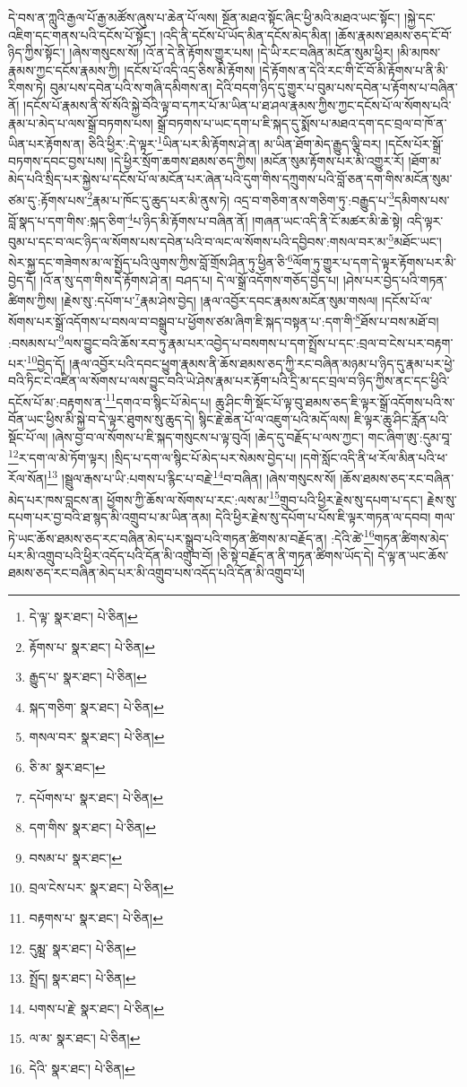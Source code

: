 དེ་བས་ན་ཀླུའི་རྒྱལ་པོ་རྒྱ་མཚོས་ཞུས་པ་ཆེན་པོ་ལས། སྔོན་མཐའ་སྟོང་ཞིང་ཕྱི་མའི་མཐའ་ཡང་སྟོང་། །སྐྱེ་དང་འཇིག་དང་གནས་པའི་དངོས་པོ་སྟོང་། །འདི་ནི་དངོས་པོ་ཡོད་མིན་དངོས་མེད་མིན། །ཆོས་རྣམས་ཐམས་ཅད་ངོ་བོ་ཉིད་ཀྱིས་སྟོང་། །ཞེས་གསུངས་སོ། །འོ་ན་དེ་ནི་རྟོགས་གྱུར་པས། །དེ་ཡི་རང་བཞིན་མངོན་སུམ་ཕྱིར། །མི་མཁས་རྣམས་ཀྱང་དངོས་རྣམས་ཀྱི། །དངོས་པོ་འདི་འདྲ་ཅིས་མི་རྟོགས། །དེ་རྟོགས་ན་དེའི་རང་གི་ངོ་བོ་མི་རྟོགས་པ་ནི་མི་རིགས་ཏེ། བུམ་པས་དབེན་པའི་ས་གཞི་དམིགས་ན། དེའི་བདག་ཉིད་དུ་གྱུར་པ་བུམ་པས་དབེན་པ་རྟོགས་པ་བཞིན་ནོ། །དངོས་པོ་རྣམས་ནི་སོ་སོའི་སྐྱེ་བོའི་ལྟ་བ་དཀར་པོ་མ་ཡིན་པ་ཐ་ཤལ་རྣམས་ཀྱིས་ཀྱང་དངོས་པོ་ལ་སོགས་པའི་རྣམ་པ་མེད་པ་ལས་སྒྲོ་བཏགས་པས། སྒྲོ་བཏགས་པ་ཡང་དག་པ་ཇི་སྐད་དུ་སྨོས་པ་མཐའ་དག་དང་བྲལ་བ་ཁོ་ན་ཡིན་པར་རྟོགས་ན། ཅིའི་ཕྱིར་:དེ་ལྟར་\footnote{དེ་ལྟ་  སྣར་ཐང་།  པེ་ཅིན། }ཡིན་པར་མི་རྟོགས་ཤེ་ན། མ་ཡིན་ཐོག་མེད་རྒྱུད་ལྕི་བར། །དངོས་པོར་སྒྲོ་བཏགས་དབང་བྱས་པས། །དེ་ཕྱིར་སྲོག་ཆགས་ཐམས་ཅད་ཀྱིས། །མངོན་སུམ་རྟོགས་པར་མི་འགྱུར་རོ། །ཐོག་མ་མེད་པའི་སྲིད་པར་སྐྱེས་པ་དངོས་པོ་ལ་མངོན་པར་ཞེན་པའི་དུག་གིས་དཀྲུགས་པའི་བློ་ཅན་དག་གིས་མངོན་སུམ་ཙམ་དུ་:རྟོགས་པས་\footnote{རྟོགས་པ་  སྣར་ཐང་།  པེ་ཅིན། }རྣམ་པ་ཁོང་དུ་ཆུད་པར་མི་ནུས་ཏེ། འདྲ་བ་གཅིག་ནས་གཅིག་ཏུ་:བརྒྱུད་པ་\footnote{རྒྱུད་པ་  སྣར་ཐང་།  པེ་ཅིན། }དམིགས་པས་བློ་སྣད་པ་དག་གིས་:སྐད་ཅིག་\footnote{སྐད་གཅིག་  སྣར་ཐང་།  པེ་ཅིན། }པ་ཉིད་མི་རྟོགས་པ་བཞིན་ནོ། །གཞན་ཡང་འདི་ནི་ངོ་མཚར་མི་ཆེ་སྟེ། འདི་ལྟར་བུམ་པ་དང་བ་ལང་ཉིད་ལ་སོགས་པས་དབེན་པའི་བ་ལང་ལ་སོགས་པའི་དབྱིབས་:གསལ་བར་མ་\footnote{གསལ་བར་  སྣར་ཐང་།  པེ་ཅིན། }མཐོང་ཡང་། སེར་སྐྱ་དང་གཟེགས་མ་ལ་སྤྱོད་པའི་ལུགས་ཀྱིས་བློ་གྲོས་ཤིན་ཏུ་ཕྱིན་ཅི་\footnote{ཅི་མ་  སྣར་ཐང་། }ལོག་ཏུ་གྱུར་པ་དག་དེ་ལྟར་རྟོགས་པར་མི་བྱེད་དོ། །འོ་ན་སུ་དག་གིས་དེ་རྟོགས་ཤེ་ན། བཤད་པ། དེ་ལ་སྒྲོ་འདོགས་གཅོད་བྱེད་པ། །ཤེས་པར་བྱེད་པའི་གཏན་ཚིགས་ཀྱིས། །རྗེས་སུ་:དཔོག་པ་\footnote{དཔོགས་པ་  སྣར་ཐང་།  པེ་ཅིན། }རྣམ་ཤེས་བྱེད། །རྣལ་འབྱོར་དབང་རྣམས་མངོན་སུམ་གསལ། །དངོས་པོ་ལ་སོགས་པར་སྒྲོ་འདོགས་པ་བསལ་བ་བསྒྲུབ་པ་ཕྱོགས་ཙམ་ཞིག་ཇི་སྐད་བསྟན་པ་:དག་གི་\footnote{དག་གིས་  སྣར་ཐང་།  པེ་ཅིན། }ཐོས་པ་བས་མཐོ་བ། :བསམས་པ་\footnote{བསམ་པ་  སྣར་ཐང་། }ལས་བྱུང་བའི་ཆོས་རབ་ཏུ་རྣམ་པར་འབྱེད་པ་བསགས་པ་དག་སྤྲོས་པ་དང་:བྲལ་བ་ངེས་པར་བརྟག་པར་\footnote{བྲལ་ངེས་པར་  སྣར་ཐང་།  པེ་ཅིན། }བྱེད་དོ། །རྣལ་འབྱོར་པའི་དབང་ཕྱུག་རྣམས་ནི་ཆོས་ཐམས་ཅད་ཀྱི་རང་བཞིན་མཉམ་པ་ཉིད་དུ་རྣམ་པར་ཕྱེ་བའི་ཏིང་ངེ་འཛིན་ལ་སོགས་པ་ལས་བྱུང་བའི་ཡེ་ཤེས་རྣམ་པར་རྟོག་པའི་དྲི་མ་དང་བྲལ་བ་ཉིད་ཀྱིས་ནང་དང་ཕྱིའི་དངོས་པོ་མ་:བརྟགས་ན་\footnote{བརྟགས་པ་  སྣར་ཐང་།  པེ་ཅིན། }དགའ་བ་སྙིང་པོ་མེད་པ། ཆུ་ཤིང་གི་སྡོང་པོ་ལྟ་བུ་ཐམས་ཅད་ཇི་ལྟར་སྒྲོ་འདོགས་པའི་ས་བོན་ཡང་ཕྱིས་མི་སྐྱེ་བ་དེ་ལྟར་ཐུགས་སུ་ཆུད་དེ། སྙིང་རྗེ་ཆེན་པོ་ལ་འཇུག་པའི་མདོ་ལས། ཇི་ལྟར་ཆུ་ཤིང་རློན་པའི་སྡོང་པོ་ལ། །ཞེས་བྱ་བ་ལ་སོགས་པ་ཇི་སྐད་གསུངས་པ་ལྟ་བུའོ། །ཆེད་དུ་བརྗོད་པ་ལས་ཀྱང་། གང་ཞིག་ཨུ་:དུམ་བཱ་\footnote{དུམྺ་  སྣར་ཐང་།  པེ་ཅིན། }ར་དག་ལ་མེ་ཏོག་ལྟར། །སྲིད་པ་དག་ལ་སྙིང་པོ་མེད་པར་སེམས་བྱེད་པ། །དགེ་སློང་འདི་ནི་ཕ་རོལ་མིན་པའི་ཕ་རོལ་སོན།\footnote{སྤྲོད།  སྣར་ཐང་།  པེ་ཅིན། } །སྦྲུལ་རྒས་པ་ཡི་:པགས་པ་རྙིང་པ་བརྗེ་\footnote{པགས་པ་རྗེ་  སྣར་ཐང་།  པེ་ཅིན། }བ་བཞིན། །ཞེས་གསུངས་སོ། །ཆོས་ཐམས་ཅད་རང་བཞིན་མེད་པར་ཁས་བླངས་ན། ཕྱོགས་ཀྱི་ཆོས་ལ་སོགས་པ་རང་:ལས་མ་\footnote{ལ་མ་  སྣར་ཐང་།  པེ་ཅིན། }གྲུབ་པའི་ཕྱིར་རྗེས་སུ་དཔག་པ་དང་། རྗེས་སུ་དཔག་པར་བྱ་བའི་ཐ་སྙད་མི་འགྲུབ་པ་མ་ཡིན་ནམ། དེའི་ཕྱིར་རྗེས་སུ་དཔོག་པ་པོས་ཇི་ལྟར་གཏན་ལ་དབབ། གལ་ཏེ་ཡང་ཆོས་ཐམས་ཅད་རང་བཞིན་མེད་པར་སྒྲུབ་པའི་གཏན་ཚིགས་མ་བརྗོད་ན། :དེའི་ཚེ་\footnote{དེའི་  སྣར་ཐང་།  པེ་ཅིན། }གཏན་ཚིགས་མེད་པར་མི་འགྲུབ་པའི་ཕྱིར་འདོད་པའི་དོན་མི་འགྲུབ་བོ། །ཅི་སྟེ་བརྗོད་ན་ནི་གཏན་ཚིགས་ཡོད་དེ། དེ་ལྟ་ན་ཡང་ཆོས་ཐམས་ཅད་རང་བཞིན་མེད་པར་མི་འགྲུབ་པས་འདོད་པའི་དོན་མི་འགྲུབ་པོ། 